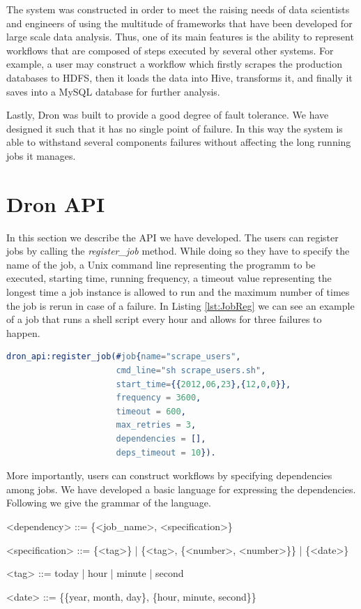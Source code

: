 \documentclass[11pt,a4paper,twoside]{report}
\begin{document}
The system was constructed in order to meet the raising needs of data scientists and engineers of using the multitude of frameworks that have been developed for large scale data analysis. Thus, one of its main features is the ability to represent workflows that are composed of steps executed by several other systems. For example, a user may construct a workflow which firstly scrapes the production databases to HDFS, then it loads the data into Hive, transforms it, and finally it saves into a MySQL database for further analysis.


Lastly, Dron was built to provide a good degree of fault tolerance. We have designed it such that it has no single point of failure. In this way the system is able to withstand several components failures without affecting the long running jobs it manages.

\section{Dron API}
In this section we describe the API we have developed. The users can register jobs by calling the \textit{register\_job} method. While doing so they have to specify the name of the job, a Unix command line representing the programm to be executed, starting time, running frequency, a timeout value representing the longest time a job instance is allowed to run and the maximum number of times the job is rerun in case of a failure. In Listing \ref{lst:JobReg} we can see an example of a job that runs a shell script every hour and allows for three failures to happen. \\


\begin{lstlisting}[language=Erlang,caption={Example of job registration},
label={lst:JobReg}]
dron_api:register_job(#job{name="scrape_users",
                      cmd_line="sh scrape_users.sh",
                      start_time={{2012,06,23},{12,0,0}},
                      frequency = 3600,
                      timeout = 600,
                      max_retries = 3,
                      dependencies = [],
                      deps_timeout = 10}).
\end{lstlisting}

More importantly, users can construct workflows by specifying dependencies among jobs. We have developed a basic language for expressing the dependencies. Following we give the grammar of the language. 

\begin{grammar}
<dependency> ::= \{<job_name>, <specification>\}

<specification> ::= \{<tag>\} | \{<tag>, \{<number>, <number>\}\} | \{<date>\}

<tag> ::= today | hour | minute | second

<date> ::= \{\{year, month, day\}, \{hour, minute, second\}\}
\end{grammar}
\end{document}
